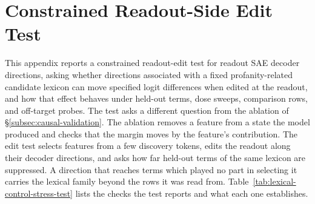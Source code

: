 \section{Constrained Readout-Side Edit Test}
\label{app:lexical-control-stress-test}

This appendix reports a constrained readout-edit test for readout SAE decoder
directions, asking whether directions associated with a fixed
profanity-related candidate lexicon can move specified logit differences when edited at the
readout, and how that effect behaves under held-out terms, dose sweeps,
comparison rows, and off-target probes. The test asks a different
question from the ablation of \S\ref{subsec:causal-validation}. The
ablation removes a feature from a state the model produced and checks
that the margin moves by the feature's contribution. The edit test
selects features from a few discovery tokens, edits the readout along
their decoder directions, and asks how far held-out terms of the same
lexicon are suppressed. A direction that reaches terms which played no
part in selecting it carries the lexical family beyond the rows it was
read from. Table~\ref{tab:lexical-control-stress-test} lists the checks
the test reports and what each one establishes.

